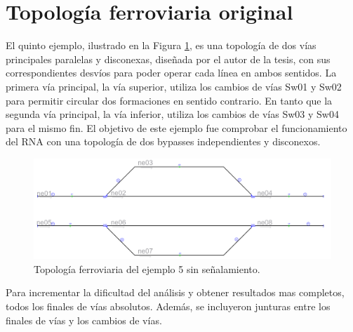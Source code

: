 \section{Topología ferroviaria original}

	El quinto ejemplo, ilustrado en la Figura \ref{fig:EJ5_1}, es una topología de dos vías principales paralelas y disconexas, diseñada por el autor de la tesis, con sus correspondientes desvíos para poder operar cada línea en ambos sentidos. La primera vía principal, la vía superior, utiliza los cambios de vías Sw01 y Sw02 para permitir circular dos formaciones en sentido contrario. En tanto que la segunda vía principal, la vía inferior, utiliza los cambios de vías Sw03 y Sw04 para el mismo fin. El objetivo de este ejemplo fue comprobar el funcionamiento del RNA con una topología de dos bypasses independientes y disconexos.
	
	\begin{figure}[h]
		\centering
		\includegraphics[width=1\textwidth]{resultados-obtenidos/ejemplo5/images/5_empty.png}
		\centering\caption{Topología ferroviaria del ejemplo 5 sin señalamiento.}
		\label{fig:EJ5_1}
	\end{figure}
	
	Para incrementar la dificultad del análisis y obtener resultados mas completos, todos los finales de vías absolutos. Además, se incluyeron junturas entre los finales de vías y los cambios de vías.
